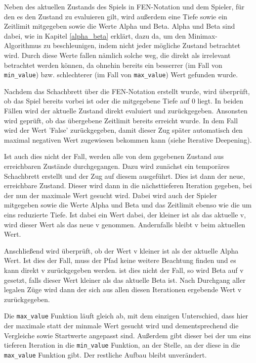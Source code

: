    Neben des aktuellen Zustands des Spiels in FEN-Notation und dem Spieler,
für den es den Zustand zu evaluieren gilt, wird außerdem eine Tiefe
sowie ein Zeitlimit mitgegeben sowie die Werte Alpha und Beta. Alpha und
Beta sind dabei, wie in Kapitel \ref{alpha_beta} erklärt, dazu da, um den
Minimax-Algorithmus zu beschleunigen, indem nicht jeder mögliche Zustand
betrachtet wird. Durch diese Werte fallen nämlich solche weg, die direkt
als irrelevant betrachtet werden können, da ohnehin bereits ein
besserrer (im Fall von \texttt{min\_value}) bzw. schlechterer (im Fall
von \texttt{max\_value}) Wert gefunden wurde.

Nachdem das Schachbrett über die FEN-Notation erstellt wurde, wird
überprüft, ob das Spiel bereits vorbei ist oder die mitgegebene Tiefe
auf 0 liegt. In beiden Fällen wird der aktuelle Zustand direkt evaluiert
und zurückgegeben. Ansonsten wird geprüft, ob das übergebene Zeitlimit
bereits erreicht wurde. In dem Fall wird der Wert 'False' 
zurückgegeben, damit dieser Zug später automatisch den maximal negativen Wert zugewiesen bekommen kann (siehe Iterative Deepening).

Ist auch dies nicht der Fall, werden alle von dem gegebenen Zustand aus
erreichbaren Zustände durchgegangen. Dazu wird zunächst ein temporäres
Schachbrett erstellt und der Zug auf diesem ausgeführt.
Dies ist dann der neue, erreichbare Zustand. Dieser wird dann in die
nächsttieferen Iteration gegeben, bei der nun der maximale Wert gesucht
wird. Dabei wird auch der Spieler mitgegeben sowie die Werte Alpha und
Beta und das Zeitlimit ebenso wie die um eins reduzierte Tiefe. Ist
dabei ein Wert dabei, der kleiner ist als das aktuelle v, wird dieser
Wert als das neue v genommen. Andernfalls bleibt v beim aktuellen Wert.

Anschließend wird überprüft, ob der Wert v kleiner ist als der aktuelle
Alpha Wert. Ist dies der Fall, muss der Pfad keine weitere Beachtung
finden und es kann direkt v zurückgegeben werden. ist dies nicht der
Fall, so wird Beta auf v gesetzt, falls dieser Wert kleiner als das
aktuelle Beta ist. Nach Durchgang aller legalen Züge wird dann der sich
aus allen diesen Iterationen ergebende Wert v zurückgegeben.

Die \texttt{max\_value} Funktion läuft gleich ab, mit dem einzigen
Unterschied, dass hier der maximale statt der minmale Wert gesucht wird
und dementsprechend die Vergleiche sowie Startwerte angepasst sind.
Außerdem gibt dieser bei der um eins tieferen Iteration in die
\texttt{min\_value} Funktion, an der Stelle, an der diese in die
\texttt{max\_value} Funktion gibt. Der restliche Aufbau bleibt
unverändert.

